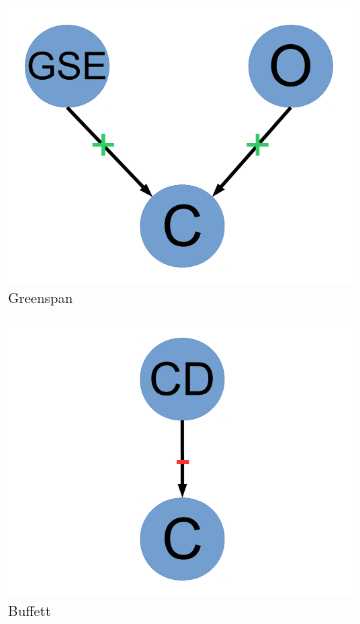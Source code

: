 \documentclass[11pt]{article}
\begin{document}
\begin{figure}
         \begin{subfigure}[b]{0.2\textwidth}
                \includegraphics[width=\textwidth]{greenspan.pdf}
                \caption{\footnotesize Greenspan}
                \label{fig:greenspan}
        \end{subfigure}
        \begin{subfigure}[b]{0.2\textwidth}
                \includegraphics[width=\textwidth]{buffett.pdf}
                \caption{\footnotesize Buffett}
                \label{fig:buffett}
        \end{subfigure}
        \begin{subfigure}[b]{0.2\textwidth}

\end{subfigure}
\end{figure}
\end{document}
